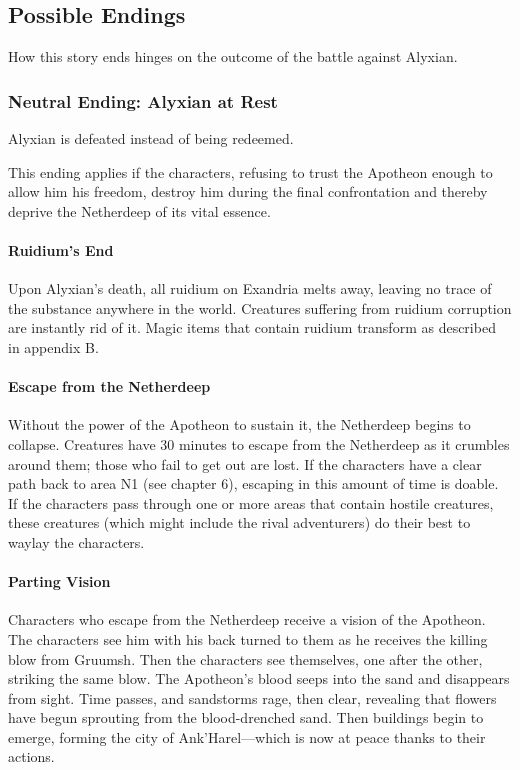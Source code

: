 \documentclass[10pt,a4paper,twoside,bg=print,twocolumn,openany,nodeprecatedcode]{dndbook}
\begin{document}
\subsection{Possible Endings}
How this story ends hinges on the outcome of the battle against Alyxian.

\subsubsection{Neutral Ending: Alyxian at Rest}
Alyxian is defeated instead of being redeemed.

This ending applies if the characters, refusing to trust the Apotheon enough to allow him his freedom, destroy him during the final confrontation and thereby deprive the Netherdeep of its vital essence.

\paragraph{Ruidium's End}
Upon Alyxian's death, all ruidium on Exandria melts away, leaving no trace of the substance anywhere in the world. Creatures suffering from ruidium corruption are instantly rid of it. Magic items that contain ruidium transform as described in appendix B.

\paragraph{Escape from the Netherdeep}
Without the power of the Apotheon to sustain it, the Netherdeep begins to collapse. Creatures have 30 minutes to escape from the Netherdeep as it crumbles around them; those who fail to get out are lost. If the characters have a clear path back to area N1 (see chapter 6), escaping in this amount of time is doable. If the characters pass through one or more areas that contain hostile creatures, these creatures (which might include the rival adventurers) do their best to waylay the characters.

\paragraph{Parting Vision}
Characters who escape from the Netherdeep receive a vision of the Apotheon. The characters see him with his back turned to them as he receives the killing blow from Gruumsh. Then the characters see themselves, one after the other, striking the same blow. The Apotheon's blood seeps into the sand and disappears from sight. Time passes, and sandstorms rage, then clear, revealing that flowers have begun sprouting from the blood-drenched sand. Then buildings begin to emerge, forming the city of Ank'Harel—which is now at peace thanks to their actions.
\end{document}
